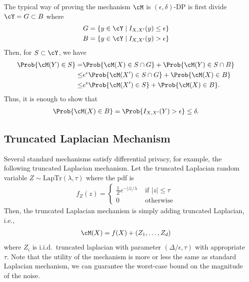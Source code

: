 \documentclass[11pt, a4paper]{article}
\begin{document}
The typical way of proving the mechanism $\cM$ is $(\epsilon, \delta)$-DP is first divide $\cY = G\subset B$ where
\begin{align}
    G &= \{y\in\cY \mid I_{X, X'}(y) \leq \epsilon\}\\
    B &= \{y\in\cY \mid I_{X, X'}(y) > \epsilon\}\\
\end{align}
Then, for $S\subset \cY$, we have
\begin{align}
    \Prob{\cM(Y) \in S} =& \Prob{\cM(X)\in S\cap G} + \Prob{\cM(Y)\in S\cap B}\\
    \leq& e^\epsilon \Prob{\cM(X')\in S\cap G} + \Prob{\cM(X)\in B}\\
    \leq& e^\epsilon \Prob{\cM(X')\in S} + \Prob{\cM(X)\in B}.
\end{align}
Thus, it is enough to show that
\begin{align}
    \Prob{\cM(X)\in B } = \Prob{I_{X, X'}(Y) > \epsilon}\leq \delta.
\end{align}

\subsection{Truncated Laplacian Mechanism}
Several standard mechanisms satisfy differential privacy, for example, the following truncated Laplacian mechanism.
Let the truncated Laplacian random variable $Z\sim\mbox{LapTr}(\lambda, \tau)$ where the pdf is
\begin{align}
    f_Z(z) = \begin{cases} \frac{1}{Z} e^{-|z|/\lambda} &\mbox{ if $|z|\leq \tau$}\\
    0&\mbox{ otherwise}
    \end{cases}
\end{align}
Then, the truncated Laplacian mechanism is simply adding truncated Laplacian, i.e.,
\begin{align}
    \cM(X) = f(X) + (Z_1, \dots, Z_d)
\end{align}
where $Z_i$ is i.i.d.\ truncated laplacian with parameter $(\Delta/\epsilon, \tau)$ with appropriate $\tau$.
Note that the utility of the mechanism is more or less the same as standard Laplacian mechanism,
we can guarantee the worst-case bound on the magnitude of the noise.
\end{document}
